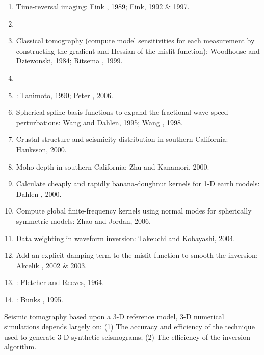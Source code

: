 \begin{enumerate}[\hspace{10mm*}]
  \item Time-reversal imaging: Fink \etal, 1989; Fink, 1992 \& 1997.
  \item \sline
  \item Classical tomography (compute model sensitivities for each measurement by constructing the gradient and Hessian of the misfit function): Woodhouse and Dziewonski, 1984; Ritsema \etal, 1999.
  \item \sline
  \item {}: Tanimoto, 1990; Peter \etal, 2006.
  \item Spherical spline basis functions to expand the fractional wave speed perturbations: Wang and Dahlen, 1995; Wang \etal, 1998.
  \item Crustal structure and seismicity distribution in southern California: Hauksson, 2000.
  \item Moho depth in southern California: Zhu and Kanamori, 2000.
  \item Calculate cheaply and rapidly banana-doughnut kernels for 1-D earth models: Dahlen \etal, 2000.
  \item Compute global finite-frequency kernels using normal modes for spherically symmetric models: Zhao and Jordan, 2006.
  \item Data weighting in waveform inversion: Takeuchi and Kobayashi, 2004.
  \item Add an explicit damping term to the misfit function to smooth the inversion: Akcelik \etal, 2002 \& 2003.
  \item {}: Fletcher and Reeves, 1964.
  \item {}: Bunks \etal, 1995.
\end{enumerate}\par
Seismic tomography based upon a 3-D reference model, 3-D numerical simulations depends largely on: (1) The accuracy and efficiency of the technique used to generate 3-D synthetic seismograms; (2) The efficiency of the inversion algorithm.\par
